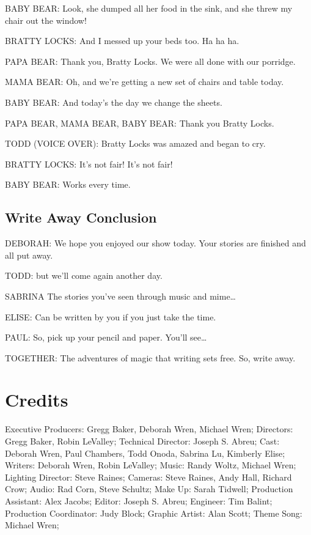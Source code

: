 BABY BEAR:
Look, she dumped all her food in the sink, and she threw my chair out the window!

BRATTY LOCKS:
And I messed up your beds too.
Ha ha ha.

PAPA BEAR:
Thank you, Bratty Locks. We were all done with our porridge.

MAMA BEAR:
Oh, and we're getting a new set of chairs and table today.

BABY BEAR:
And today's the day we change the sheets.

PAPA BEAR, MAMA BEAR, BABY BEAR:
Thank you Bratty Locks.

TODD (VOICE OVER):
Bratty Locks was amazed and began to cry.

BRATTY LOCKS:
It's not fair! It's not fair!

BABY BEAR:
Works every time.

\subsection{Write Away Conclusion}

DEBORAH:
We hope you enjoyed our show today.
Your stories are finished and all put away.

TODD:
but we'll come again another day.

SABRINA
The stories you've seen through music and mime\dots

ELISE:
Can be written by you if you just take the time.

PAUL:
So, pick up your pencil and paper. You'll see\dots

TOGETHER:
The adventures of magic that writing sets free.
So, write away.

\section{Credits}

Executive Producers: Gregg Baker, Deborah Wren, Michael Wren;
Directors: Gregg Baker, Robin LeValley;
Technical Director: Joseph S. Abreu;
Cast: Deborah Wren, Paul Chambers, Todd Onoda, Sabrina Lu, Kimberly Elise;
Writers: Deborah Wren, Robin LeValley;
Music: Randy Woltz, Michael Wren;
Lighting Director: Steve Raines;
Cameras: Steve Raines, Andy Hall, Richard Crow;
Audio: Rad Corn, Steve Schultz;
Make Up: Sarah Tidwell;
Production Assistant: Alex Jacobs;
Editor: Joseph S. Abreu;
Engineer: Tim Balint;
Production Coordinator: Judy Block;
Graphic Artist: Alan Scott;
Theme Song: Michael Wren;

